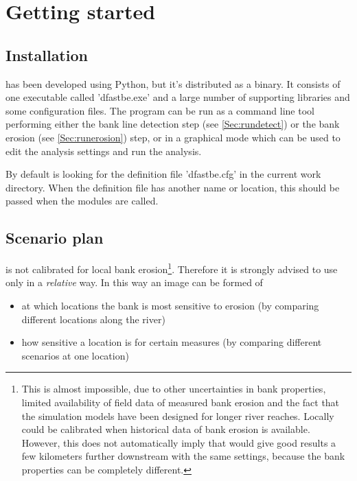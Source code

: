 \chapter{Getting started} \label{GetStarted}

\section{Installation}

\dfastbe has been developed using Python, but it's distributed as a binary.
It consists of one executable called 'dfastbe.exe' and a large number of supporting libraries and some configuration files.
The program can be run as a command line tool performing either the bank line detection step (see \autoref{Sec:rundetect}) or the bank erosion (see \autoref{Sec:runerosion}) step, or in a graphical mode which can be used to edit the analysis settings and run the analysis.

By default \dfastbe is looking for the definition file 'dfastbe.cfg' in the current work directory.
When the definition file has another name or location, this should be passed when the modules are called.

\section{Scenario plan}

\dfastbe is not calibrated for local bank erosion\footnote{This is almost impossible, due to other uncertainties in bank properties, limited availability of field data of measured bank erosion and the fact that the simulation models have been designed for longer river reaches.
Locally \dfastbe could be calibrated when historical data of bank erosion is available.
However, this does not automatically imply that \dfastbe would give good results a few kilometers further downstream with the same settings, because the bank properties can be completely different.}.
Therefore it is strongly advised to use \dfastbe only in a \emph{relative} way.
In this way an image can be formed of

\begin{itemize}
\item at which locations the bank is most sensitive to erosion (by comparing different locations along the river)
\item how sensitive a location is for certain measures (by comparing different scenarios at one location)
\end{itemize}

